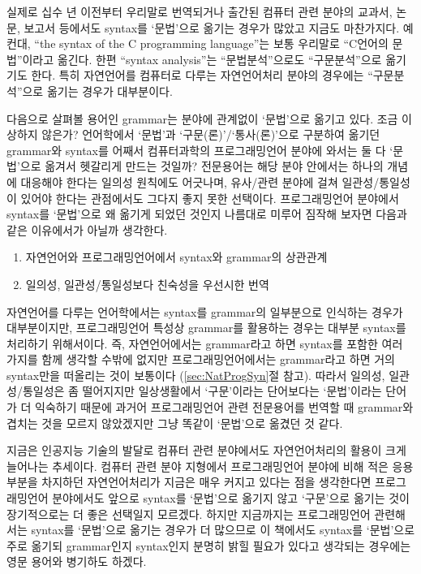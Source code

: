 실제로 십수 년 이전부터 우리말로 번역되거나 출간된 컴퓨터 관련 분야의
교과서, 논문, 보고서 등에서도 syntax를 `문법'으로 옮기는 경우가 많았고
지금도 마찬가지다. 예컨대, ``the syntax of the C programming language''는
보통 우리말로 ``C언어의 문법''이라고 옮긴다. 한편 ``syntax analysis''는
``문법분석''으로도 ``구문분석''으로 옮기기도 한다. 특히 자연언어를 컴퓨터로
다루는 자연언어처리 분야의 경우에는 ``구문분석''으로 옮기는 경우가 대부분이다.

다음으로 살펴볼 용어인 grammar는 분야에 관계없이 `문법'으로 옮기고 있다.
조금 이상하지 않은가? 언어학에서 `문법'과 `구문(론)'/`통사(론)'으로 구분하여
옮기던 grammar와 syntax를 어째서 컴퓨터과학의 프로그래밍언어 분야에 와서는
둘 다 `문법'으로 옮겨서 헷갈리게 만드는 것일까? 전문용어는 해당 분야 안에서는
하나의 개념에 대응해야 한다는 일의성 원칙에도 어긋나며, 유사/관련 분야에 걸쳐
일관성/통일성이 있어야 한다는 관점에서도 그다지 좋지 못한 선택이다.
프로그래밍언어 분야에서 syntax를 `문법'으로 왜 옮기게 되었던 것인지
나름대로 미루어 짐작해 보자면 다음과 같은 이유에서가 아닐까 생각한다.
\begin{enumerate}\tightlist
    \item 자연언어와 프로그래밍언어에서 syntax와 grammar의 상관관계
    \item 일의성, 일관성/통일성보다 친숙성을 우선시한 번역
\end{enumerate}

자연언어를 다루는 언어학에서는 syntax를 grammar의 일부분으로 인식하는 경우가
대부분이지만, 프로그래밍언어 특성상 grammar를 활용하는 경우는 대부분
syntax를 처리하기 위해서이다. 즉, 자연언어에서는 grammar라고 하면 syntax를
포함한 여러 가지를 함께 생각할 수밖에 없지만 프로그래밍언어에서는 grammar라고
하면 거의 syntax만을 떠올리는 것이 보통이다 (\ref{sec:NatProgSyn}절 참고).
따라서 일의성, 일관성/통일성은 좀 떨어지지만 일상생활에서 `구문'이라는
단어보다는 `문법'이라는 단어가 더 익숙하기 때문에 과거어 프로그래밍언어 관련
전문용어를 번역할 때 grammar와 겹치는 것을 모르지 않았겠지만 그냥 똑같이
`문법'으로 옮겼던 것 같다.

지금은 인공지능 기술의 발달로 컴퓨터 관련 분야에서도 자연언어처리의 활용이
크게 늘어나는 추세이다. 컴퓨터 관련 분야 지형에서 프로그래밍언어 분야에 비해
적은 응용 부분을 차지하던 자연언어처리가 지금은 매우 커지고 있다는 점을
생각한다면 프로그래밍언어 분야에서도 앞으로 syntax를 `문법'으로 옮기지 않고
`구문'으로 옮기는 것이 장기적으로는 더 좋은 선택일지 모르겠다. 하지만
지금까지는 프로그래밍언어 관련해서는 syntax를 `문법'으로 옮기는 경우가 더
많으므로 이 책에서도 syntax를 `문법'으로 주로 옮기되 grammar인지 syntax인지
분명히 밝힐 필요가 있다고 생각되는 경우에는 영문 용어와 병기하도 하겠다.

